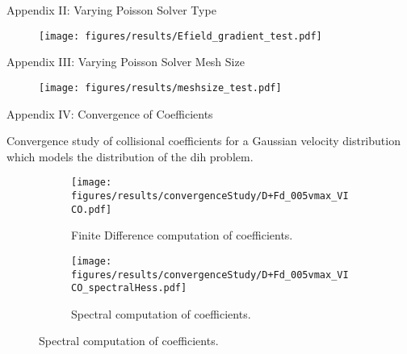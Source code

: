 \begin{frame}{Appendix II: Varying Poisson Solver Type}
    \begin{figure}
        \begin{center}
            \texttt{[image: figures/results/Efield\_gradient\_test.pdf]}
        \end{center}
            \label{fig:EfieldGradientTest}
    \end{figure}
\end{frame}

\begin{frame}{Appendix III: Varying Poisson Solver Mesh Size}
    \begin{figure}
        \begin{center}
            \texttt{[image: figures/results/meshsize\_test.pdf]}
        \end{center}
            \label{fig:meshsize_test_VICO}
    \end{figure}
\end{frame}

\begin{frame}{Appendix IV: Convergence of Coefficients}
\item Convergence study of collisional coefficients for a Gaussian
        velocity distribution which models the distribution of the \gls{dih} problem.
    \begin{figure}[h]
        \begin{subfigure}[b]{0.5\textwidth}
            \texttt{[image: figures/results/convergenceStudy/D+Fd\_005vmax\_VICO.pdf]}
            \caption{Finite Difference computation of coefficients.}
            \label{fig:convergence_DFd_VICO_FD}
        \end{subfigure}
        \hfill
        \begin{subfigure}[b]{0.465\textwidth}
            \texttt{[image: figures/results/convergenceStudy/D+Fd\_005vmax\_VICO\_spectralHess.pdf]}
            \caption{Spectral computation of coefficients.}
            \label{fig:convergence_DFd_VICO_spectral}
        \end{subfigure}
        \label{fig:convergence_VICO_spectral_FD_comparison}
    \end{figure}
\end{frame}

